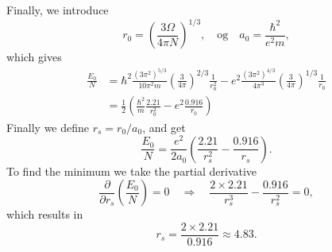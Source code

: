 Finally, we introduce
\[ r_0 = \left( \frac{3\Omega}{4\pi N} \right)^{1/3}, \quad \text{og} \quad
a_0 = \frac{\hbar^2}{e^2 m} , \]
%
which gives
\begin{align*}
\frac{E_0}{N} &=
%
\hbar^2 \frac{(3\pi^2)^{5/3}}{10\pi^2 m} \left( \frac{3}{4\pi} \right)^{2/3} \frac{1}{r_0^2} -
e^2 \frac{(3\pi^2)^{4/3}}{4\pi^3} \left( \frac{3}{4\pi} \right)^{1/3} \frac{1}{r_0} \\
%
&= \frac{1}{2} \left( \frac{\hbar^2}{m} \frac{2.21}{r_0^2} -
e^2 \frac{0.916}{r_0} \right)
\end{align*}
Finally we define  $r_s = r_0 / a_0$, and get
\[
\frac{E_0}{N} = \frac{e^2}{2a_0} \left( \frac{2.21}{r_s^2} - \frac{0.916}{r_s} \right).
\]
%
To find the minimum we take the partial derivative
\[ \frac{\partial}{\partial r_s} \left( \frac{E_0}{N} \right) = 0 \quad \Rightarrow \quad
\frac{2 \times 2.21}{r_s^3} - \frac{0.916}{r_s^2} = 0, \]
%
which results in
\[ r_s = \frac{2 \times 2.21}{0.916} \approx 4.83 . \]










